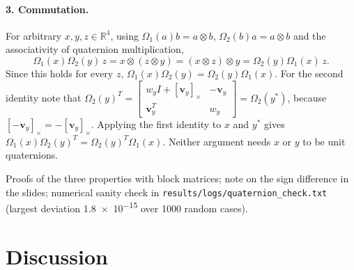 \documentclass[a4paper]{tufte-handout}
\begin{document}
\paragraph{3. Commutation.}
For arbitrary $x, y, z \in \mathbb{R}^4$, using $\Omega_1(a)b = a \otimes b$,
$\Omega_2(b)a = a \otimes b$ and the associativity of quaternion
multiplication,
\begin{equation*}
\Omega_1(x)\Omega_2(y)\,z = x \otimes (z \otimes y)
= (x \otimes z) \otimes y = \Omega_2(y)\Omega_1(x)\,z .
\end{equation*}
Since this holds for every $z$, $\Omega_1(x)\Omega_2(y) = \Omega_2(y)\Omega_1(x)$.
For the second identity note that
$\Omega_2(y)^T = \left[\begin{smallmatrix} w_y I + [\bm v_y]_\times & -\bm v_y\\ \bm v_y^T & w_y\end{smallmatrix}\right] = \Omega_2(y^*)$,
because $[-\bm v_y]_\times = -[\bm v_y]_\times$.
Applying the first identity to $x$ and $y^*$ gives
$\Omega_1(x)\Omega_2(y)^T = \Omega_2(y)^T\Omega_1(x)$.
Neither argument needs $x$ or $y$ to be unit quaternions.

\begin{evidence}
Proofs of the three properties with block matrices; note on the sign
difference in the slides; numerical sanity check in
\texttt{results/logs/quaternion\_check.txt} (largest deviation
\num{1.8e-15} over 1000 random cases).
\end{evidence}

\section{Discussion}
\end{document}
